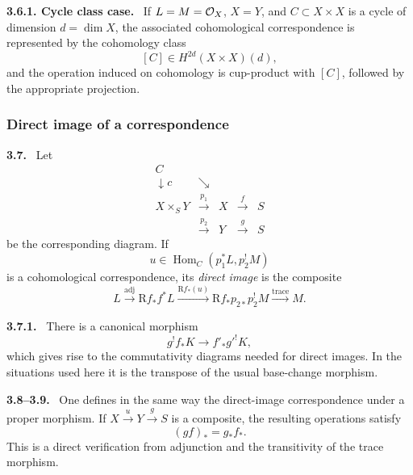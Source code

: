 \documentclass[11pt]{article}
\theoremstyle{plain}
\theoremstyle{definition}
\theoremstyle{remark}
\newenvironment{statement}[1]{\par\medskip\noindent\textbf{#1.}\ }{\par\medskip}
\DeclareMathOperator{\Hom}{Hom}
\newcommand{\R}{\mathrm R}
\begin{document}
\begin{statement}{3.6.1. Cycle class case}
If $L=M=\mathcal O_X$, $X=Y$, and $C\subset X\times X$ is a cycle of dimension $d=\dim X$, the associated cohomological correspondence is represented by the cohomology class
\[
   [C]\in H^{2d}(X\times X)(d),
\]
and the operation induced on cohomology is cup-product with $[C]$, followed by the appropriate projection.
\end{statement}

\subsubsection*{Direct image of a correspondence}

\begin{statement}{3.7}
Let
\[
\begin{array}{ccccc}
C & & & & \\
\downarrow c & \searrow & & & \\
X\times_S Y & \xrightarrow{p_1} & X & \xrightarrow{f} & S \\
& \xrightarrow{p_2} & Y & \xrightarrow{g} & S
\end{array}
\]
be the corresponding diagram. If
\[
   u\in \Hom_C(p_1^*L,p_2^!M)
\]
is a cohomological correspondence, its \emph{direct image} is the composite
\begin{equation}
   L\xrightarrow{\mathrm{adj}} \R f_*f^*L
    \xrightarrow{\R f_*(u)} \R f_*p_{2*}p_2^!M
    \xrightarrow{\mathrm{trace}} M .
   \tag{3.7.1}
\end{equation}
\end{statement}

\begin{statement}{3.7.1}
There is a canonical morphism
\begin{equation}
   g^!f_*K\longrightarrow f'_*g'^!K,
   \tag{3.7.2}
\end{equation}
which gives rise to the commutativity diagrams needed for direct images. In the situations used here it is the transpose of the usual base-change morphism.
\end{statement}

\begin{statement}{3.8--3.9}
One defines in the same way the direct-image correspondence under a proper morphism. If $X\xrightarrow{u}Y\xrightarrow{g}S$ is a composite, the resulting operations satisfy
\[
   (g f)_*=g_*f_*.
\]
This is a direct verification from adjunction and the transitivity of the trace morphism.
\end{statement}
\end{document}
